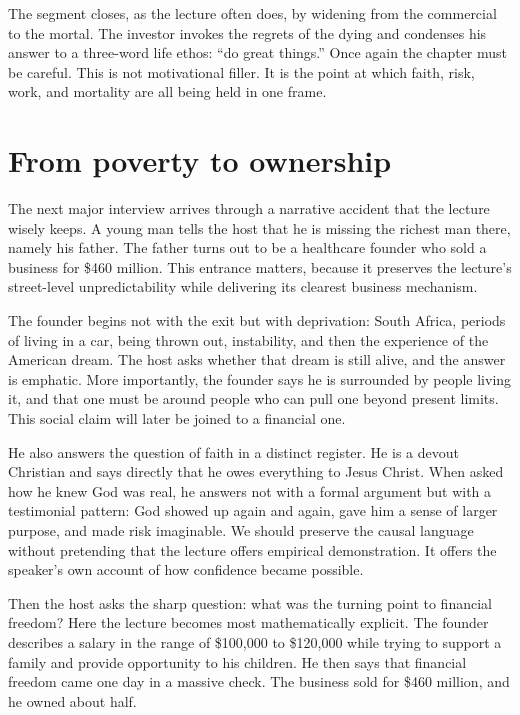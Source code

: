 The segment closes, as the lecture often does, by widening from the commercial to the mortal. The investor invokes the regrets of the dying and condenses his answer to a three-word life ethos: ``do great things.'' Once again the chapter must be careful. This is not motivational filler. It is the point at which faith, risk, work, and mortality are all being held in one frame.

\section{From poverty to ownership}

The next major interview arrives through a narrative accident that the lecture wisely keeps. A young man tells the host that he is missing the richest man there, namely his father. The father turns out to be a healthcare founder who sold a business for \$460 million. This entrance matters, because it preserves the lecture's street-level unpredictability while delivering its clearest business mechanism.

The founder begins not with the exit but with deprivation: South Africa, periods of living in a car, being thrown out, instability, and then the experience of the American dream. The host asks whether that dream is still alive, and the answer is emphatic. More importantly, the founder says he is surrounded by people living it, and that one must be around people who can pull one beyond present limits. This social claim will later be joined to a financial one.

He also answers the question of faith in a distinct register. He is a devout Christian and says directly that he owes everything to Jesus Christ. When asked how he knew God was real, he answers not with a formal argument but with a testimonial pattern: God showed up again and again, gave him a sense of larger purpose, and made risk imaginable. We should preserve the causal language without pretending that the lecture offers empirical demonstration. It offers the speaker's own account of how confidence became possible.

Then the host asks the sharp question: what was the turning point to financial freedom? Here the lecture becomes most mathematically explicit. The founder describes a salary in the range of \$100{,}000 to \$120{,}000 while trying to support a family and provide opportunity to his children. He then says that financial freedom came one day in a massive check. The business sold for \$460 million, and he owned about half.

